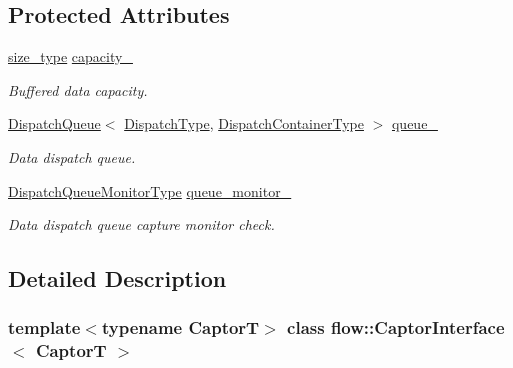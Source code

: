 \subsection*{Protected Attributes}
\begin{DoxyCompactItemize}
\item 
\mbox{\label{classflow_1_1_captor_interface_a3675a127538e71404b53f7b1c36923d4}} 
\hyperlink{classflow_1_1_captor_interface_a62db6a158eebcb377e63ede6a1f1a8c6}{size\+\_\+type} \hyperlink{classflow_1_1_captor_interface_a3675a127538e71404b53f7b1c36923d4}{capacity\+\_\+}
\begin{DoxyCompactList}\small\item\em Buffered data capacity. \end{DoxyCompactList}\item 
\mbox{\label{classflow_1_1_captor_interface_a79b57c2c5af6220ec0342d75a654661c}} 
\hyperlink{classflow_1_1_dispatch_queue}{Dispatch\+Queue}$<$ \hyperlink{classflow_1_1_captor_interface_ae1eafeb6cd50f4a50843b963c232720a}{Dispatch\+Type}, \hyperlink{classflow_1_1_captor_interface_a887171bf3b12d8232922a81844ea9a7d}{Dispatch\+Container\+Type} $>$ \hyperlink{classflow_1_1_captor_interface_a79b57c2c5af6220ec0342d75a654661c}{queue\+\_\+}
\begin{DoxyCompactList}\small\item\em Data dispatch queue. \end{DoxyCompactList}\item 
\mbox{\label{classflow_1_1_captor_interface_af8223b74249ca989f05b34ea776e8345}} 
\hyperlink{classflow_1_1_captor_interface_a6624ec49c575e3a4c2730be405afe179}{Dispatch\+Queue\+Monitor\+Type} \hyperlink{classflow_1_1_captor_interface_af8223b74249ca989f05b34ea776e8345}{queue\+\_\+monitor\+\_\+}
\begin{DoxyCompactList}\small\item\em Data dispatch queue capture monitor check. \end{DoxyCompactList}\end{DoxyCompactItemize}


\subsection{Detailed Description}
\subsubsection*{template$<$typename CaptorT$>$\newline
class flow\+::\+Captor\+Interface$<$ Captor\+T $>$}


